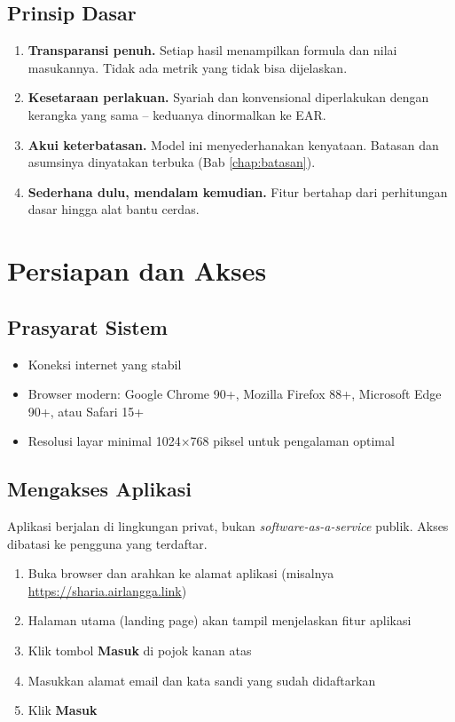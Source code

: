 \documentclass[12pt,a4paper,twoside]{report}
\begin{document}
\section{Prinsip Dasar}

\begin{enumerate}
  \item \textbf{Transparansi penuh.} Setiap hasil menampilkan formula dan nilai masukannya. Tidak ada metrik yang tidak bisa dijelaskan.
  \item \textbf{Kesetaraan perlakuan.} Syariah dan konvensional diperlakukan dengan kerangka yang sama -- keduanya dinormalkan ke EAR.
  \item \textbf{Akui keterbatasan.} Model ini menyederhanakan kenyataan. Batasan dan asumsinya dinyatakan terbuka (Bab \ref{chap:batasan}).
  \item \textbf{Sederhana dulu, mendalam kemudian.} Fitur bertahap dari perhitungan dasar hingga alat bantu cerdas.
\end{enumerate}

\chapter{Persiapan dan Akses}

\section{Prasyarat Sistem}

\begin{itemize}
  \item Koneksi internet yang stabil
  \item Browser modern: Google Chrome 90+, Mozilla Firefox 88+, Microsoft Edge 90+, atau Safari 15+
  \item Resolusi layar minimal 1024$\times$768 piksel untuk pengalaman optimal
\end{itemize}

\section{Mengakses Aplikasi}

Aplikasi berjalan di lingkungan privat, bukan \emph{software-as-a-service} publik. Akses dibatasi ke pengguna yang terdaftar.

\begin{enumerate}
  \item Buka browser dan arahkan ke alamat aplikasi (misalnya \url{https://sharia.airlangga.link})
  \item Halaman utama (landing page) akan tampil menjelaskan fitur aplikasi
  \item Klik tombol \textbf{Masuk} di pojok kanan atas
  \item Masukkan alamat email dan kata sandi yang sudah didaftarkan
  \item Klik \textbf{Masuk}
\end{enumerate}
\end{document}
